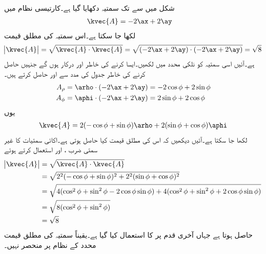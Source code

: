 شکل  میں  سے  تک سمتیہ  دکھایا گیا ہے۔کارتیسی نظام میں 
\begin{align}\label{مساوات_سمتیہ_کارتیسی_نظام_سمتیہ_مثال}
\kvec{A}&=-2\ax+2\ay
\end{align}
لکھا جا سکتا ہے۔اس سمتیہ کی مطلق قیمت
\begin{align*}
\abs{\kvec{A}}= \sqrt{\kvec{A} \cdot \kvec{A}}=\sqrt{(-2\ax+2\ay) \cdot (-2\ax+2\ay)}=\sqrt{8}
\end{align*}
ہے۔آئیں اسی سمتیہ کو نلکی محدد میں لکھیں۔ایسا کرنے کی خاطر  اور  درکار ہوں گے جنہیں حاصل کرنے کی خاطر جدول   کی مدد سے  اور  حاصل کرتے ہیں۔
\begin{align*}
A_\rho&=\arho \cdot (-2\ax+2\ay)=-2 \cos \phi +2 \sin \phi\\
A_\phi&=\aphi \cdot  (-2\ax+2\ay)=2 \sin \phi +2 \cos \phi
\end{align*}
یوں
\begin{align}\label{مساوات_سمتیہ_نلکی_نظام_سمتیہ_مثال}
\kvec{A}=2(- \cos \phi + \sin \phi) \arho +2( \sin \phi + \cos \phi)\aphi
\end{align}
لکھا جا سکتا ہے۔آئیں دیکھیں کہ اس کی مطلق قیمت کیا حاصل ہوتی ہے۔اکائی سمتیات کا غیر سمتی ضرب ،  اور  استعمال کرتے ہوئے
\begin{align*}
\abs{\kvec{A}}&=\sqrt{\kvec{A} \cdot \kvec{A}}\\
&=\sqrt{2^2(- \cos \phi + \sin \phi)^2+2^2( \sin \phi + \cos \phi)^2 }\\
&=\sqrt{4(\cos^2 \phi +\sin^2 \phi -2 \cos \phi \sin \phi)+4(\cos^2 \phi +\sin^2 \phi +2 \cos \phi \sin \phi)}\\
&=\sqrt{8(\cos^2 \phi+\sin^2 \phi)}\\
&=\sqrt{8}
\end{align*}
حاصل ہوتا ہے جہاں آخری قدم پر  کا استعمال کیا گیا ہے۔یقیناً سمتیہ کی مطلق قیمت محدد کے نظام پر منحصر نہیں۔

